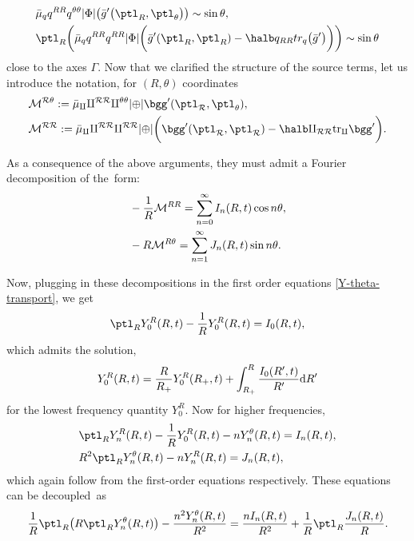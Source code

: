 \begin{align*}
& \bar{\mu}_q q^{RR} q^{\theta \theta} \vert \Phi \vert \bigl(\bar{g}' \bigl(\ptl_R, \ptl_\theta\bigr)\bigr)\sim \sin \theta ,\\
&\ptl_R \biggl(\bar{\mu}_q q^{RR} q^{RR} \vert \Phi \vert \biggl(\bar{g}' (\ptl_R, \ptl_R) - \halb q_{RR} tr_q \bigl(\bar{g}'\bigr)\biggr)\biggr) \sim \sin \theta
\end{align*}
close to the axes $\Gamma$. Now that we clarified the structure of the source terms, let us introduce the notation, for $(R, \theta)$ coordinates
\begin{align*}
&\cal{M}^{ R \theta }:= \bar{\mu}_q q^{RR} q^{\theta \theta} \vert \Phi \vert \bgg'(\ptl_R, \ptl_\theta), \notag\\
&\cal{M}^{R R}:= \bar{\mu}_q q^{R R} q^{RR} \vert \Phi \vert \biggl(\bgg' (\ptl_R, \ptl_R) - \halb q_{RR} {\rm tr}_q \bgg'\biggr).
\end{align*}

 As a consequence of the above arguments, they must admit a Fourier decomposition of the~form:
\begin{align*}
&- \frac{1}{R} \mathcal{M}^{RR}= \sum^\infty_{n = 0} I_n (R, t) \cos n \theta , \notag\\
&-R \mathcal{M}^{R \theta}= \sum^\infty_{n=1} J_n (R, t) \sin n \theta.
\end{align*}

Now, plugging in these decompositions in the first order equations \eqref{Y-theta-transport}, we
get
\begin{align*}
\ptl_R Y^R_0 (R, t) - \frac{1}{R} Y^R_0 (R, t) = I_0 (R, t),
\end{align*}
which admits the solution,
\begin{align*}
Y^R_0 (R, t) = \frac{R}{R_+} Y_0^R (R_+, t) + \int^R_{R_+} \frac{I_0 (R', t)}{R'} {\rm d}R'
\end{align*}
for the lowest frequency quantity $Y^R_0$. Now for higher frequencies,
\begin{align*}
&\ptl_R Y_n^R (R, t) - \frac{1}{R} Y^R_0 (R, t) - n Y^\theta_n (R, t)= I_n (R, t), \notag\\
& R^2 \ptl_R Y^\theta _n (R, t) - n Y^R_n (R, t) = J_n (R, t),
\end{align*}
which again follow from the first-order equations respectively. These equations can be decoupled~as
\begin{align} \label{Y-first-order-modes}
\frac{1}{R} \ptl_R \bigl(R \ptl_R Y^\theta_n (R, t)\bigr) - \frac{n^2 Y^\theta_n(R, t)}{R^2} = \frac{n I_n (R, t)}{R^2} + \frac{1}{R}
\ptl_R \frac{J_n (R, t)}{R}.
\end{align}

